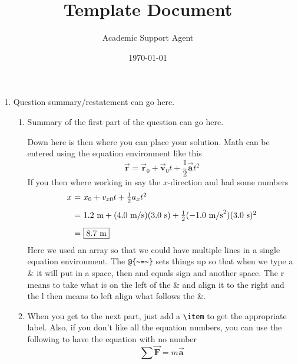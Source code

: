 \documentclass{article}
\title{Template Document}
\author{Academic Support Agent}
\date{\today}
\begin{document}
\maketitle

\maketitle
\begin{enumerate}[leftmargin=\labelsep]
\item Question summary/restatement can go here.
    \begin{enumerate}
    \item Summary of the first part of the question can go here.

    Down here is then where you can place your solution. Math can be entered using the equation
    environment like this
    \begin{equation}
        \vec{\mathbf{r}} = \vec{\mathbf{r}}_{0} + \vec{\mathbf{v}}_{0}t + \frac{1}{2}\vec{\mathbf{a}}t^{2}
    \end{equation}
    If you then where working in say the $x$-direction and had some numbers %
    \begin{equation}
    \begin{array}{r@{~=~}l}
    x & x_{0} + v_{x0}t + \frac{1}{2}a_{x}t^{2} \\ [2ex]
    & 1.2~\text{m} + (4.0~\text{m/s})(3.0~\text{s}) + \frac{1}{2}(-1.0~\text{m/s}^{2})(3.0~\text{s})^{2}\\ [2ex]
    & \boxed{8.7~\text{m}}
    \end{array}
    \end{equation}
    Here we used an array so that we could have multiple lines in a single equation environment. The
    \verb"@{~=~}" sets things up so that when we type a \& it will put in a space, then and equals sign
    and another space. The r means to take what is on the left of the \& and align it to the right
    and the l then means to left align what follows the \&.

    \item When you get to the next part, just add a \verb"\item" to get the appropriate label. Also,
    if you don't like all the equation numbers, you can use the following to have the equation with
    no number
    \begin{equation*}
    \sum\vec{\mathbf{F}} = m\vec{\mathbf{a}}
    \end{equation*}


\end{enumerate}
\end{enumerate}
\end{document}
